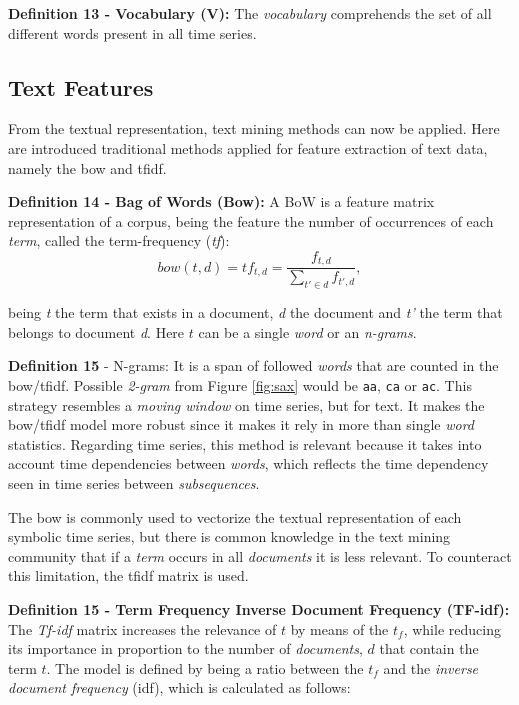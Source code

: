 \item \textbf{Definition 13 - Vocabulary (V):} The \textit{vocabulary} comprehends the set of all different words present in all time series.

\subsection{Text Features}
\label{subsec:text_features}

From the textual representation, text mining methods can now be applied. Here are introduced traditional methods applied for feature extraction of text data, namely the \gls{bow} and  \gls{tfidf}.

\item \textbf{Definition 14 - Bag of Words (Bow):} A BoW is a feature matrix representation of a corpus, being the feature the number of occurrences of each \textit{term}, called the term-frequency (\textit{tf}):
\begin{equation}
\label{eq:tf}
    bow(t,d) = tf_{t, d} = \frac{f_{t,d}}{\sum\limits_{t'\in d} f_{t',d}}, 
\end{equation}

being \textit{t} the term that exists in a document, \textit{d} the document and \textit{t'} the term that belongs to document \textit{d}. Here $t$ can be a single \textit{word} or an \textit{n-grams}.

\item \textbf{Definition 15} - N-grams: It is a span of followed \textit{words} that are counted in the \gls{bow}/\gls{tfidf}. Possible \textit{2-gram} from Figure \ref{fig:sax} would be \texttt{aa}, \texttt{ca} or \texttt{ac}. This strategy resembles a \textit{moving window} on time series, but for text. It makes the \gls{bow}/\gls{tfidf} model more robust since it makes it rely in more than single \textit{word} statistics. Regarding time series, this method is relevant because it takes into account time dependencies between \textit{words}, which reflects the time dependency seen in time series between \textit{subsequences}.


The \gls{bow} is commonly used to vectorize the textual representation of each symbolic time series, but there is common knowledge in the text mining community that if a \textit{term} occurs in all \textit{documents} it is less relevant. To counteract this limitation, the \gls{tfidf} matrix is used.

\item \textbf{Definition 15 - Term Frequency Inverse Document Frequency (TF-idf):} The \textit{Tf-idf} matrix increases the relevance of $t$ by means of the $t_f$, while reducing its importance in proportion to the number of \textit{documents}, $d$ that contain the term $t$. The model is defined by being a ratio between the $t_f$ and the \textit{inverse document frequency} (idf), which is calculated as follows:


